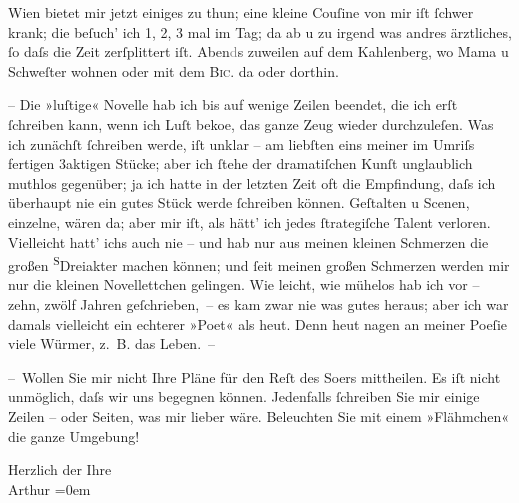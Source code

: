 \pstart
           Wien bietet mir jetzt einiges zu thun; eine kleine
                  Couſine von mir iſt
               ſchwer krank; die beſuch’ ich 1, 2, 3 mal im Tag; da{\geminationn} ab
               u zu irgend was andres ärztliches, ſo daſs die Zeit zerſplittert iſt.
                  Aben\textcolor{gray}{d}s zuweilen auf dem Kahlenberg, wo Mama u Schweſter
               wohnen oder mit dem \textsc{Bic.} da oder dorthin.\pend
           
\pstart
           {\pb}– Die »luſtige« Novelle hab ich bis auf wenige Zeilen beendet, die ich erſt
               ſchreiben kann, wenn ich Luſt beko{\geminationm}e, das ganze Zeug
               wieder durchzuleſen. Was ich zunächſt ſchreiben werde, iſt unklar – am liebſten eins
               meiner im Umriſs fertigen 3aktigen Stücke; aber ich ſtehe der dramatiſchen Kunſt
               unglaublich muthlos gegenüber; ja ich hatte in der letzten Zeit oft die Empfindung,
               daſs ich überhaupt nie {\pb}ein gutes Stück werde ſchreiben
               können. Geſtalten u Scenen, einzelne, wären da; aber mir iſt, als hätt’ ich jedes
               ſtrategiſche Talent verloren. Vielleicht hatt’ ichs auch nie – und hab nur aus meinen
               kleinen Schmerzen die großen \substVorne{}\textsuperscript{S}\substDazwischen{}D\substHinten{}reiakter machen können; und ſeit meinen großen Schmerzen  werden mir nur die kleinen Novellettchen gelingen.
               Wie leicht, wie mühelos hab ich vor – zehn, zwölf Jahren geſchrieben, – {\pb}es kam zwar nie was gutes heraus; aber ich war damals
               vielleicht ein echterer »Poet« als heut. Denn heut nagen an meiner Poeſie viele
               Würmer, z. B. das Leben. –\pend
           
\pstart
           – Wollen Sie mir nicht Ihre Pläne für den Reſt des So{\geminationm}ers mittheilen. Es iſt nicht unmöglich, daſs wir uns begegnen können. Jedenfalls
               ſchreiben Sie mir einige Zeilen – oder Seiten, was mir lieber wäre. Beleuchten {\pb}Sie mit einem »Flähmchen« die ganze Umgebung!\pend
           
\pstart
           Herzlich der Ihre{\\[\baselineskip]}\spacefill\mbox{Arthur}\pend
           \leftskip=0em{}\endnumbering{}  
      
